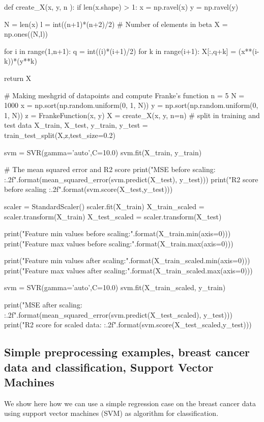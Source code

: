 \documentclass[%
oneside,                 %
final,                   %
10pt]{article}
\begin{document}
def create_X(x, y, n ):
	if len(x.shape) > 1:
		x = np.ravel(x)
		y = np.ravel(y)

	N = len(x)
	l = int((n+1)*(n+2)/2)		# Number of elements in beta
	X = np.ones((N,l))

	for i in range(1,n+1):
		q = int((i)*(i+1)/2)
		for k in range(i+1):
			X[:,q+k] = (x**(i-k))*(y**k)

	return X


# Making meshgrid of datapoints and compute Franke's function
n = 5
N = 1000
x = np.sort(np.random.uniform(0, 1, N))
y = np.sort(np.random.uniform(0, 1, N))
z = FrankeFunction(x, y)
X = create_X(x, y, n=n)    
# split in training and test data
X_train, X_test, y_train, y_test = train_test_split(X,z,test_size=0.2)


svm = SVR(gamma='auto',C=10.0)
svm.fit(X_train, y_train)

# The mean squared error and R2 score
print("MSE before scaling: {:.2f}".format(mean_squared_error(svm.predict(X_test), y_test)))
print("R2 score before scaling {:.2f}".format(svm.score(X_test,y_test)))

scaler = StandardScaler()
scaler.fit(X_train)
X_train_scaled = scaler.transform(X_train)
X_test_scaled = scaler.transform(X_test)

print("Feature min values before scaling:\n {}".format(X_train.min(axis=0)))
print("Feature max values before scaling:\n {}".format(X_train.max(axis=0)))

print("Feature min values after scaling:\n {}".format(X_train_scaled.min(axis=0)))
print("Feature max values after scaling:\n {}".format(X_train_scaled.max(axis=0)))

svm = SVR(gamma='auto',C=10.0)
svm.fit(X_train_scaled, y_train)

print("MSE after  scaling: {:.2f}".format(mean_squared_error(svm.predict(X_test_scaled), y_test)))
print("R2 score for  scaled data: {:.2f}".format(svm.score(X_test_scaled,y_test)))

\epycod



\subsection{Simple preprocessing examples, breast cancer data and classification, Support Vector Machines}

We show here how we can use a simple regression case on the breast
cancer data using support vector machines (SVM) as algorithm for
classification.
\end{document}
